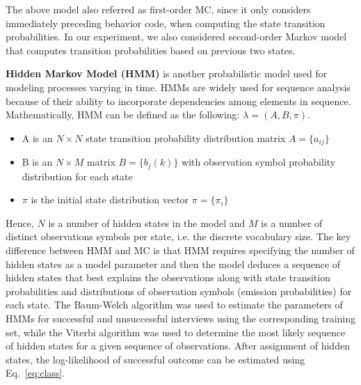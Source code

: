 \documentclass{amia_summit_2018}
\begin{document}
The above model also referred as first-order MC, since it only considers immediately preceding behavior code, when computing the state transition probabilities. In our experiment, we also considered
second-order Markov model that computes transition probabilities based on previous two states.  

\textbf {Hidden Markov Model (HMM)} is another probabilistic model used for modeling processes varying in time. HMMs are widely used for sequence analysis because of their ability to incorporate dependencies among elements in sequence. Mathematically, HMM can be defined as the following: $\lambda = (A, B, \pi)$.
\begin{itemize}
\item A is an $N\times N$ state transition probability distribution matrix $A = \{a_{ij}\}$
\item B is an $N\times M$ matrix $B = \{b_j(k)\}$ with observation symbol probability distribution for each state 
\item $\pi$ is the initial state distribution vector $\pi = \{\pi_i\}$
\end{itemize}
Hence, $N$ is a number of hidden states in the model and $M$ is a number of distinct observations symbols per state, i.e. the discrete vocabulary size. The key difference between HMM and MC is that HMM requires specifying the number of hidden states as a model parameter and then the model deduces a sequence of hidden states that best explains the observations along with state transition probabilities and distributions of observation symbols (emission probabilities) for each state. The Baum-Welch algorithm was used to estimate the parameters of HMMs for successful and unsuccessful interviews using the corresponding training set, while the Viterbi algorithm was used to determine the most likely sequence of hidden states for a given sequence of observations. After assignment of hidden states, the log-likelihood of successful outcome can be estimated using Eq.~\ref{eq:class}.
\end{document}

